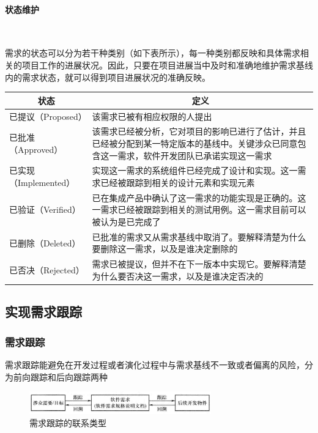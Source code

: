 \paragraph*{状态维护}~{} \par
需求的状态可以分为若干种类别（如下表所示），每一种类别都反映和具体需求相关的项目工作的进展状况。因此，只要在项目进展当中及时和准确地维护需求基线内的需求状态，就可以得到项目进展状况的准确反映。
\vspace{-0.8em}
\begin{center}
\begin{longtable}{|m{4cm}<{\centering}|m{9cm}|}
    \hline
    \multicolumn{1}{|c|}{状态} & \multicolumn{1}{c|}{定义}                                                 \\ \hline
    已提议（Proposed）            & 该需求已被有相应权限的人提出                                                          \\ \hline
    已批准（Approved）            & 该需求已经被分析，它对项目的影响已进行了估计，并且已经被分配到某一特定版本的基线中。关键涉众已同意包含这一需求，软件开发团队已承诺实现这一需求 \\ \hline
    已实现（Implemented）         & 实现这一需求的系统组件已经完成了设计和实现。这一需求已经被跟踪到相关的设计元素和实现元素                            \\ \hline
    已验证（Verified）            & 已在集成产品中确认了这一需求的功能实现是正确的。这一需求已经被跟踪到相关的测试用例。这一需求目前可以被认为是已完成了              \\ \hline
    已删除（Deleted）             & 已批准的需求又从需求基线中取消了。要解释清楚为什么要删除这一需求，以及是谁决定删除的                              \\ \hline
    已否决（Rejected）            & 需求已被提议，但并不在下一版本中实现它。要解释清楚为什么要否决这一需求，以及是谁决定否决的                           \\ \hline
\end{longtable}
\end{center}
\vspace{-3.7em}


\subsection{实现需求跟踪}

\subsubsection{需求跟踪}
需求跟踪能避免在开发过程或者演化过程中与需求基线不一致或者偏离的风险，分为前向跟踪和后向跟踪两种
\begin{figure}[H]
	\centering
    \vspace{-0.5em}
	\includegraphics[width=0.7\textwidth]{img/需求跟踪的联系类型.png}
    \caption*{需求跟踪的联系类型}
    \vspace{-1em}
\end{figure}

